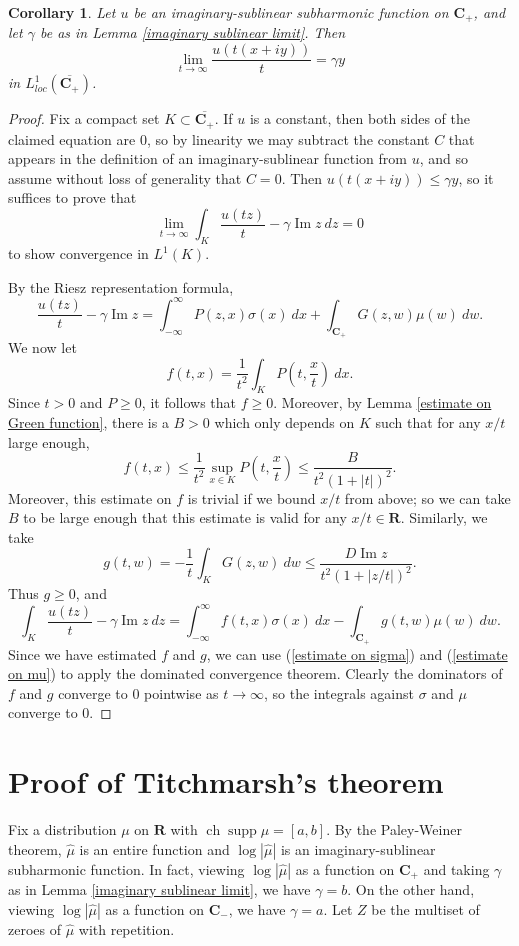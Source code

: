 \documentclass[12pt]{report}
\newcommand{\RR}{\mathbf{R}}
\newcommand{\CC}{\mathbf{C}}
\DeclareMathOperator{\ch}{ch}
\DeclareMathOperator{\supp}{supp}
\renewcommand{\Im}{\operatorname{Im}}
\newtheorem{corollary}[theorem]{Corollary}
\theoremstyle{definition}
\theoremstyle{remark}
\begin{document}
\begin{corollary}
    \label{gamma in mean}
    Let $u$ be an imaginary-sublinear subharmonic function on $\CC_+$, and let $\gamma$ be as in Lemma \ref{imaginary sublinear limit}. Then
$$\lim_{t \to \infty} \frac{u(t(x + iy))}{t} = \gamma y$$
    in $L^1_{loc}(\overline{\CC_+})$.
\end{corollary}
\begin{proof}
    Fix a compact set $K \subset \overline{\CC_+}$. If $u$ is a constant, then both sides of the claimed equation are $0$, so by linearity we may subtract the constant $C$ that appears in the definition of an imaginary-sublinear function from $u$, and so assume without loss of generality that $C = 0$. Then $u(t(x+iy)) \leq \gamma y$, so it suffices to prove that
$$\lim_{t \to \infty} \int_K \frac{u(tz)}{t} - \gamma \Im z ~dz = 0$$
    to show convergence in $L^1(K)$.

    By the Riesz representation formula,
$$\frac{u(tz)}{t} - \gamma \Im z = \int_{-\infty}^\infty P(z, x) \sigma(x) ~dx + \int_{\CC_+} G(z, w) \mu(w) ~dw.$$
    We now let
    $$f(t, x) = \frac{1}{t^2} \int_K P\left(t, \frac{x}{t}\right) ~dx.$$
    Since $t > 0$ and $P \geq 0$, it follows that $f \geq 0$. Moreover, by Lemma \ref{estimate on Green function}, there is a $B > 0$ which only depends on $K$ such that for any $x/t$ large enough,
    $$f(t, x) \leq \frac{1}{t^2} \sup_{x \in K} P\left(t, \frac{x}{t}\right) \leq \frac{B}{t^2(1 + |t|)^2}.$$
    Moreover, this estimate on $f$ is trivial if we bound $x/t$ from above; so we can take $B$ to be large enough that this estimate is valid for any $x/t \in \RR$. Similarly, we take
    $$g(t, w) = -\frac{1}{t} \int_K G(z, w) ~dw \leq \frac{D \Im z}{t^2(1+|z/t|)^2}.$$
    Thus $g \geq 0$, and
    $$\int_K \frac{u(tz)}{t} - \gamma \Im z ~dz = \int_{-\infty}^\infty f(t, x) \sigma(x) ~dx - \int_{\CC_+} g(t, w) \mu(w) ~dw.$$
    Since we have estimated $f$ and $g$, we can use (\ref{estimate on sigma}) and (\ref{estimate on mu}) to apply the dominated convergence theorem. Clearly the dominators of $f$ and $g$ converge to $0$ pointwise as $t \to \infty$, so the integrals against $\sigma$ and $\mu$ converge to $0$.
\end{proof}



\section{Proof of Titchmarsh's theorem}
Fix a distribution $\mu$ on $\RR$ with $\ch \supp \mu = [a, b]$. By the Paley-Weiner theorem, $\hat \mu$ is an entire function and $\log |\hat \mu|$ is an imaginary-sublinear subharmonic function. In fact, viewing $\log |\hat \mu|$ as a function on $\CC_+$ and taking $\gamma$ as in Lemma \ref{imaginary sublinear limit}, we have $\gamma = b$. On the other hand, viewing $\log |\hat \mu|$ as a function on $\CC_-$, we have $\gamma = a$. Let $Z$ be the multiset of zeroes of $\hat \mu$ with repetition.
\end{document}
